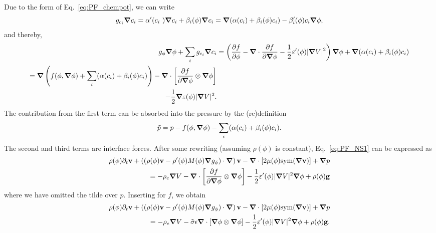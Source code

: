 \documentclass[preprint,pre,superscriptaddress,a4paper]{revtex4-1}
\renewcommand{\v}[1]{\ensuremath{\mathbf{#1}}} %
\newcommand{\gv}[1]{\ensuremath{\mbox{\boldmath$ #1 $}}}
\newcommand{\pd}[2]{\frac{\partial #1}{\partial #2}}
\newcommand{\grad}[1]{\gv{\nabla} #1} %
\renewcommand{\div}[1]{\gv{\nabla} \cdot #1} %
\newcommand{\pdt}[1]{\partial_t #1}
\newcommand{\sym}[1]{\mathrm{sym} #1 }
\begin{document}
Due to the form of Eq.~\eqref{eq:PF_chempot}, we can write
\begin{equation}
  g_{c_i} \grad c_i = \alpha'(c_i )\grad c_i + \beta_i (\phi) \grad c_i = \grad ( \alpha(c_i) + \beta_i(\phi) c_i) - \beta_i'(\phi) c_i \grad \phi,
\end{equation}
and thereby,
\begin{align}
  g_\phi \grad \phi + \sum_i g_{c_i} \grad c_i &= \left( \pd f \phi - \div \pd f {\grad \phi} - \frac 1 2 \varepsilon'(\phi) | \grad V |^2\right) \grad \phi + \grad ( \alpha(c_i) + \beta_i(\phi) c_i) \\
                                               \begin{split} = \grad \left( f(\phi, \grad \phi) + \sum_i ( \alpha(c_i) + \beta_i(\phi) c_i) \right) - \div \left[ \pd f {\grad \phi} \otimes \grad \phi \right] \\ - \frac 1 2 \grad \varepsilon(\phi) | \grad V |^2.
                                                 \end{split}
\end{align}
The contribution from the first term can be absorbed into the pressure by the (re)definition
\begin{equation}
  \tilde p = p - f(\phi, \grad \phi) - \sum_i ( \alpha(c_i) + \beta_i(\phi) c_i ) .
\end{equation}
The second and third terms are interface forces.
After some rewriting (assuming $\rho(\phi)$ is constant), Eq.~\eqref{eq:PF_NS1} can be expressed as
\begin{equation}
  \begin{split}
    \rho(\phi) \pdt \v v + \left( \left(\rho(\phi) \v v - \rho'(\phi) M(\phi) \grad g_\phi  \right) \cdot \grad \right) \v v -
    \div \left[ 2 \mu(\phi) \sym (\grad \v v) \right] + \grad p \\
    = - \rho_e \grad V - \div \left[ \pd f {\grad \phi} \otimes \grad \phi \right]  - \frac 1 2 \varepsilon'(\phi) | \grad V |^2 \grad \phi + \rho(\phi) \v g
  \end{split}
\end{equation}
where we have omitted the tilde over $p$. Inserting for $f$, we obtain
\begin{equation}
  \begin{split}
    \rho(\phi) \pdt \v v + \left( \left(\rho(\phi) \v v - \rho'(\phi) M(\phi) \grad g_\phi  \right) \cdot \grad \right) \v v -
    \div \left[ 2 \mu(\phi) \sym (\grad \v v) \right] + \grad p \\
    = - \rho_e \grad V - \tilde \sigma \epsilon\div \left[ \grad \phi \otimes \grad \phi \right]  - \frac 1 2 \varepsilon'(\phi) | \grad V |^2 \grad \phi + \rho(\phi) \v g .
  \end{split}
\end{equation}
\end{document}

